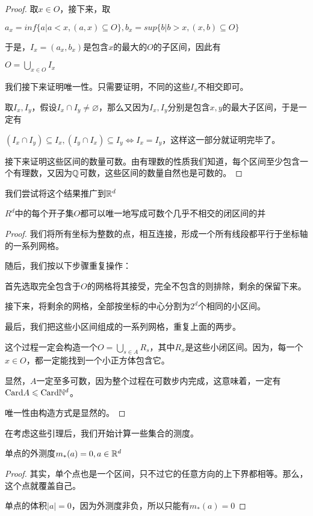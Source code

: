 \documentclass[12pt, a4paper, oneside, UTF8]{ctexbook}
\begin{document}
			\begin{proof}
				取$x \in O$，接下来，取
				
				$a_x = inf \{a| a<x,(a,x) \subseteq O\},b_x = sup \{b|b>x,(x,b) \subseteq O\}$
				
				于是，$I_x = (a_x,b_x)$是包含$x$的最大的$O$的子区间，因此有
				
				$O = \bigcup\limits_{x \in O} I_x$
				
				我们接下来证明唯一性。只需要证明，不同的这些$I_x$不相交即可。
				
				取$I_x,I_y$，假设$I_x \cap I_y \neq \varnothing$，那么又因为$I_x,I_y$分别是包含$x,y$的最大子区间，于是一定有
				
				$(I_x \cap I_y) \subseteq I_x,(I_y \cap I_x) \subseteq I_y \Leftrightarrow I_x = I_y$，这样这一部分就证明完毕了。
				
				接下来证明这些区间的数量可数。由有理数的性质我们知道，每个区间至少包含一个有理数，又因为$\mathbb{Q}$可数，这些区间的数量自然也是可数的。
			\end{proof}
			我们尝试将这个结果推广到$\mathbb{R}^d$
			\begin{them}{}{}
				$R^d$中的每个开子集$O$都可以唯一地写成可数个几乎不相交的闭区间的并
			\end{them}
			\begin{proof}
				我们将所有坐标为整数的点，相互连接，形成一个所有线段都平行于坐标轴的一系列网格。
				
				随后，我们按以下步骤重复操作：
				
				首先选取完全包含于$O$的网格将其接受，完全不包含的则排除，剩余的保留下来。
				
				接下来，将剩余的网格，全部按坐标的中心分割为$2^d$个相同的小区间。
				
				最后，我们把这些小区间组成的一系列网格，重复上面的两步。
				
				这个过程一定会构造一个$O = \bigcup\limits_{s \in A} R_s$，其中$R_x$是这些小闭区间。因为，每一个$x \in O$，都一定能找到一个小正方体包含它。
				
				显然，$A$一定至多可数，因为整个过程在可数步内完成，这意味着，一定有$\text{Card}A \leqslant \text{Card}\mathbb{N}^d$。
				
				唯一性由构造方式是显然的。
			\end{proof}
			在考虑这些引理后，我们开始计算一些集合的测度。
			\begin{example}
				单点的外测度$m_*(a)=0,a\in \mathbb{R}^d$
			\end{example}
			\begin{proof}
				其实，单个点也是一个区间，只不过它的任意方向的上下界都相等。那么，这个点就覆盖自己。
				
				单点的体积$|a|=0$，因为外测度非负，所以只能有$m_*(a)=0$
			\end{proof}
\end{document}
